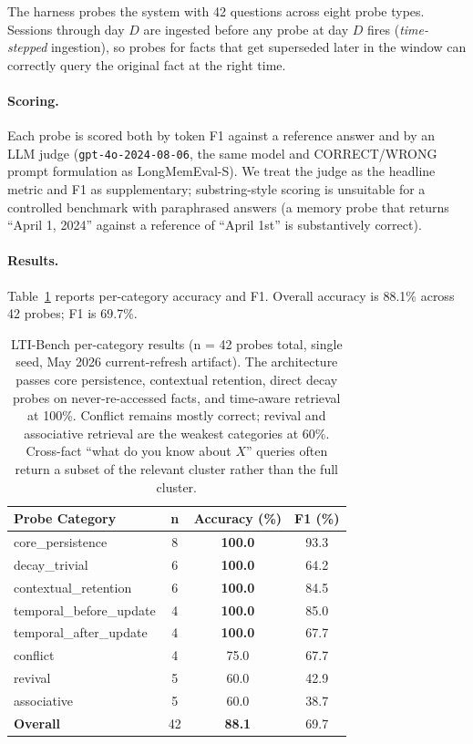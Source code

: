 \documentclass[11pt,a4paper]{article}
\begin{document}
The harness probes the system with 42 questions across eight probe types. Sessions through day $D$ are ingested before any probe at day $D$ fires (\emph{time-stepped} ingestion), so probes for facts that get superseded later in the window can correctly query the original fact at the right time.

\paragraph{Scoring.} Each probe is scored both by token F1 against a reference answer and by an LLM judge (\texttt{gpt-4o-2024-08-06}, the same model and CORRECT/WRONG prompt formulation as LongMemEval-S). We treat the judge as the headline metric and F1 as supplementary; substring-style scoring is unsuitable for a controlled benchmark with paraphrased answers (a memory probe that returns ``April 1, 2024'' against a reference of ``April 1st'' is substantively correct).

\paragraph{Results.} Table~\ref{tab:lti} reports per-category accuracy and F1. Overall accuracy is 88.1\% across 42 probes; F1 is 69.7\%.

\begin{table}[htbp]
\centering
\small
\begin{tabular}{@{}lccc@{}}
\toprule
\textbf{Probe Category} & \textbf{n} & \textbf{Accuracy (\%)} & \textbf{F1 (\%)} \\
\midrule
core\_persistence & 8 & \textbf{100.0} & 93.3 \\
decay\_trivial & 6 & \textbf{100.0} & 64.2 \\
contextual\_retention & 6 & \textbf{100.0} & 84.5 \\
temporal\_before\_update & 4 & \textbf{100.0} & 85.0 \\
temporal\_after\_update & 4 & \textbf{100.0} & 67.7 \\
conflict & 4 & 75.0 & 67.7 \\
revival & 5 & 60.0 & 42.9 \\
associative & 5 & 60.0 & 38.7 \\
\midrule
\textbf{Overall} & 42 & \textbf{88.1} & 69.7 \\
\bottomrule
\end{tabular}
\caption{LTI-Bench per-category results (n = 42 probes total, single seed, May 2026 current-refresh artifact). The architecture passes core persistence, contextual retention, direct decay probes on never-re-accessed facts, and time-aware retrieval at 100\%. Conflict remains mostly correct; revival and associative retrieval are the weakest categories at 60\%. Cross-fact ``what do you know about $X$'' queries often return a subset of the relevant cluster rather than the full cluster.}
\label{tab:lti}
\end{table}
\end{document}
